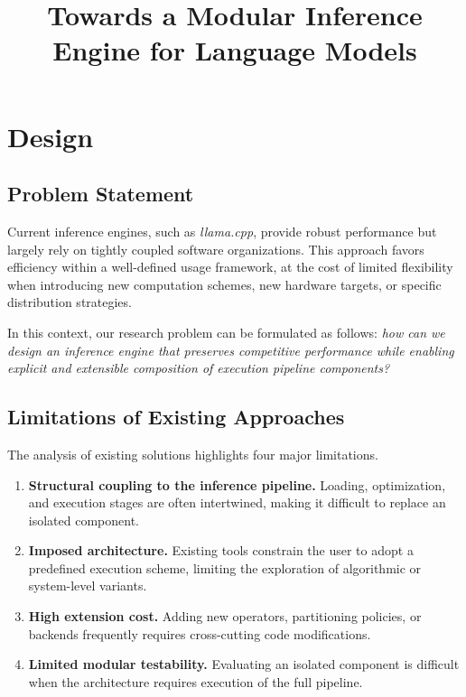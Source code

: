 \documentclass[11pt,a4paper]{article}
\title{Towards a Modular Inference Engine for Language Models}
\author{}
\date{}
\begin{document}
\maketitle

\section{Design}

\subsection{Problem Statement}

Current inference engines, such as \textit{llama.cpp}, provide robust performance but largely rely on tightly coupled software organizations. This approach favors efficiency within a well-defined usage framework, at the cost of limited flexibility when introducing new computation schemes, new hardware targets, or specific distribution strategies.

In this context, our research problem can be formulated as follows: \textit{how can we design an inference engine that preserves competitive performance while enabling explicit and extensible composition of execution pipeline components?}

\subsection{Limitations of Existing Approaches}

The analysis of existing solutions highlights four major limitations.

\begin{enumerate}[leftmargin=*]
	\item \textbf{Structural coupling to the inference pipeline.} Loading, optimization, and execution stages are often intertwined, making it difficult to replace an isolated component.
	\item \textbf{Imposed architecture.} Existing tools constrain the user to adopt a predefined execution scheme, limiting the exploration of algorithmic or system-level variants.
	\item \textbf{High extension cost.} Adding new operators, partitioning policies, or backends frequently requires cross-cutting code modifications.
	\item \textbf{Limited modular testability.} Evaluating an isolated component is difficult when the architecture requires execution of the full pipeline.
\end{enumerate}
\end{document}
